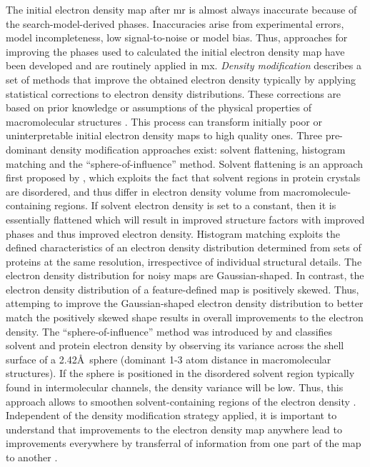The initial electron density map after \gls{mr} is almost always inaccurate because of the search-model-derived phases. Inaccuracies arise from experimental errors, model incompleteness, low signal-to-noise or model bias. Thus, approaches for improving the phases used to calculated the initial electron density map have been developed and are routinely applied in \gls{mx}. \textit{Density modification} describes a set of methods that improve the obtained electron density typically by applying statistical corrections to electron density distributions. These corrections are based on prior knowledge or assumptions of the physical properties of macromolecular structures \cite{Rupp2010-nc}. This process can transform initially poor or uninterpretable initial electron density maps to high quality ones. Three pre-dominant density modification approaches exist: solvent flattening, histogram matching and the ``sphere-of-influence'' method. Solvent flattening is an approach first proposed by \textcite{Wang1985-zu}, which exploits the fact that solvent regions in protein crystals are disordered, and thus differ in electron density volume from macromolecule-containing regions. If solvent electron density is set to a constant, then it is essentially flattened which will result in improved structure factors with improved phases and thus improved electron density. Histogram matching \cite{Lunin1988-lx} exploits the defined characteristics of an electron density distribution determined from sets of proteins at the same resolution, irrespectivce of individual structural details. The electron density distribution for noisy maps are Gaussian-shaped. In contrast, the electron density distribution of a feature-defined map is positively skewed. Thus, attemping to improve the Gaussian-shaped electron density distribution to better match the positively skewed shape results in overall improvements to the electron density. The ``sphere-of-influence'' method was introduced by \textcite{Sheldrick2002-tx} and classifies solvent and protein electron density by observing its variance across the shell surface of a 2.42\AA\ sphere (dominant 1-3 atom distance in macromolecular structures). If the sphere is positioned in the disordered solvent region typically found in intermolecular channels, the density variance will be low. Thus, this approach allows to smoothen solvent-containing regions of the electron density \cite{Sheldrick2002-tx}. Independent of the density modification strategy applied, it is important to understand that improvements to the electron density map anywhere lead to improvements everywhere by transferral of information from one part of the map to another \cite{Terwilliger2000-sz}.

